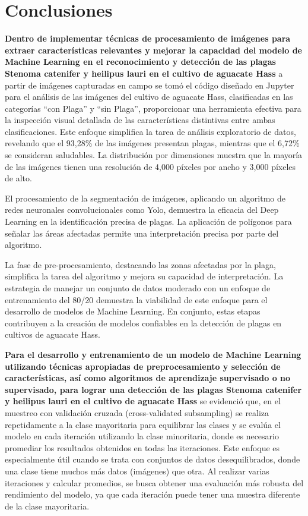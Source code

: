 \section{Conclusiones}

\textbf{Dentro de implementar técnicas de procesamiento de imágenes para extraer características relevantes y mejorar la capacidad del modelo de Machine Learning en el reconocimiento y detección de las plagas Stenoma catenifer y heilipus lauri en el cultivo de aguacate Hass} a partir de imágenes capturadas en campo se tomó el código diseñado en Jupyter para el análisis de las imágenes del cultivo de aguacate Hass, clasificadas en las categorías ``con Plaga'' y ``sin Plaga'', proporcionar una herramienta efectiva para la inspección visual detallada de las características distintivas entre ambas clasificaciones. Este enfoque simplifica la tarea de análisis exploratorio de datos, revelando que el 93,28\% de las imágenes presentan plagas, mientras que el 6,72\% se consideran saludables. La distribución por dimensiones muestra que la mayoría de las imágenes tienen una resolución de 4,000 píxeles por ancho y 3,000 píxeles de alto. \newline

El procesamiento de la segmentación de imágenes, aplicando un algoritmo de redes neuronales convolucionales como Yolo, demuestra la eficacia del Deep Learning en la identificación precisa de plagas. La aplicación de polígonos para señalar las áreas afectadas permite una interpretación precisa por parte del algoritmo. \newline

La fase de pre-procesamiento, destacando las zonas afectadas por la plaga, simplifica la tarea del algoritmo y mejora su capacidad de interpretación. La estrategia de manejar un conjunto de datos moderado con un enfoque de entrenamiento del 80/20 demuestra la viabilidad de este enfoque para el desarrollo de modelos de Machine Learning. En conjunto, estas etapas contribuyen a la creación de modelos confiables en la detección de plagas en cultivos de aguacate Hass.

\newpage

\textbf{Para el desarrollo y entrenamiento de un modelo de Machine Learning utilizando técnicas apropiadas de preprocesamiento y selección de características, así como algoritmos de aprendizaje supervisado o no supervisado, para lograr una detección de las plagas Stenoma catenifer y heilipus lauri en el cultivo de aguacate Hass} se evidenció que, en el muestreo con validación cruzada (cross-validated subsampling) se realiza repetidamente a la clase mayoritaria para equilibrar las clases y se evalúa el modelo en cada iteración utilizando la clase minoritaria, donde es necesario promediar los resultados obtenidos en todas las iteraciones. Este enfoque es especialmente útil cuando se trata con conjuntos de datos desequilibrados, donde una clase tiene muchos más datos (imágenes) que otra. Al realizar varias iteraciones y calcular promedios, se busca obtener una evaluación más robusta del rendimiento del modelo, ya que cada iteración puede tener una muestra diferente de la clase mayoritaria. \newline

